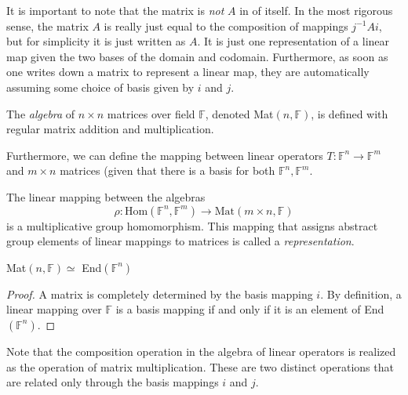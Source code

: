 \documentclass{article}
\begin{document}
    It is important to note that the matrix is \textit{not} $A$ in of itself. In the most rigorous sense, the matrix $A$ is really just equal to the composition of mappings $ j^{-1} A i$, but for simplicity it is just written as $A$. It is just one representation of a linear map given the two bases of the domain and codomain. Furthermore, as soon as one writes down a matrix to represent a linear map, they are automatically assuming some choice of basis given by $i$ and $j$. 

    \begin{definition}
      The \textit{algebra} of $n \times n$ matrices over field $\mathbb{F}$, denoted Mat$(n, \mathbb{F})$, is defined with regular matrix addition and multiplication. 
    \end{definition}

    Furthermore, we can define the mapping between linear operators $T: \mathbb{F}^n \longrightarrow \mathbb{F}^m$ and $m \times n$ matrices (given that there is a basis for both $\mathbb{F}^n, \mathbb{F}^m$. 

    \begin{definition}
      The linear mapping between the algebras 
      \begin{equation}
        \rho: \text{Hom}(\mathbb{F}^n, \mathbb{F}^m) \longrightarrow \text{Mat}(m \times n, \mathbb{F})
      \end{equation}
      is a multiplicative group homomorphism. This mapping that assigns abstract group elements of linear mappings to matrices is called a \textit{representation}. 
    \end{definition}

    \begin{proposition}
      Mat$(n, \mathbb{F}) \simeq $ End$(\mathbb{F}^n)$ 
    \end{proposition}
    \begin{proof}
      A matrix is completely determined by the basis mapping $i$. By definition, a linear mapping over $\mathbb{F}$ is a basis mapping if and only if it is an element of End$(\mathbb{F}^n)$. 
    \end{proof}

    Note that the composition operation in the algebra of linear operators is realized as the operation of matrix multiplication. These are two distinct operations that are related only through the basis mappings $i$ and $j$. 
\end{document}
